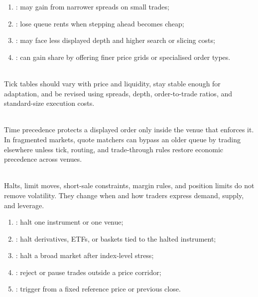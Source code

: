 \begin{taxonomy} 
\begin{enumerate}[label=\roman*.]
\setlength{\itemsep}{0pt}
\item {}: may gain from narrower spreads on small trades;
\item {}: lose queue rents when stepping ahead becomes cheap;
\item {}: may face less displayed depth and higher search or slicing costs;
\item {}: can gain share by offering finer price grids or specialised order types.
\end{enumerate}
\end{taxonomy}

\begin{principle} \\
Tick tables should vary with price and liquidity, stay stable enough for adaptation, and be revised using spreads, depth, order-to-trade ratios, and standard-size execution costs.
\end{principle}

\begin{caveat} \\
Time precedence protects a displayed order only inside the venue that enforces it.\\
In fragmented markets, quote matchers can bypass an older queue by trading elsewhere unless tick, routing, and trade-through rules restore economic precedence across venues.
\end{caveat}

\begin{marketrule} \\
Halts, limit moves, short-sale constraints, margin rules, and position limits do not remove volatility. They change when and how traders express demand, supply, and leverage.
\end{marketrule}

\begin{taxonomy} 
\begin{enumerate}[label=\roman*.]
\setlength{\itemsep}{0pt}
\item {}: halt one instrument or one venue;
\item {}: halt derivatives, ETFs, or baskets tied to the halted instrument;
\item {}: halt a broad market after index-level stress;
\item {}: reject or pause trades outside a price corridor;
\item {}: trigger from a fixed reference price or previous close.
\end{enumerate}
\end{taxonomy}

